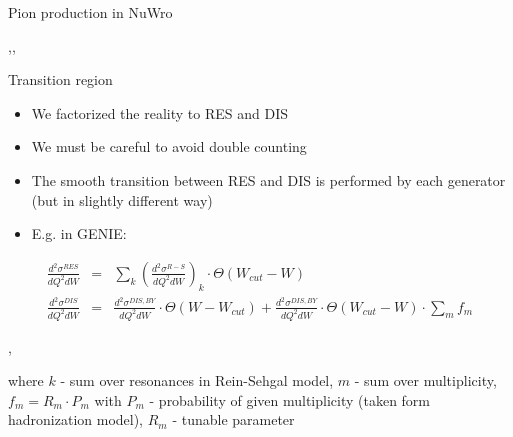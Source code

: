 \begin{slide}[toc=$\pi$ in NuWro]{Pion production in NuWro}
\null\vfill

  \centering

  \sep\sep
  

\vfill\null
\end{slide}

\begin{wideslide}{Transition region}
\null\vfill

  \begin{itemize}
    \item We factorized the reality to RES and DIS 
    \item We must be careful to avoid double counting
    \item The smooth transition between RES and DIS is performed by each generator (but in slightly different way)
    \item E.g. in GENIE:
  \end{itemize}
    
  \begin{eqnarray*}
    \frac{d^2\sigma^{RES}}{dQ^2dW} & = & \sum\limits_k \left(\frac{d^2\sigma^{R-S}}{dQ^2dW}\right)_k\cdot\Theta(W_{cut} - W) \\
    \frac{d^2\sigma^{DIS}}{dQ^2dW} & = & \frac{d^2\sigma^{DIS,BY}}{dQ^2dW}\cdot\Theta(W - W_{cut}) + \frac{d^2\sigma^{DIS,BY}}{dQ^2dW}\cdot\Theta(W_{cut} - W)\cdot\sum\limits_m f_m
  \end{eqnarray*}
  
  \sep
  
  where $k$ - sum over resonances in Rein-Sehgal model, $m$ - sum over multiplicity, $f_m = R_m\cdot P_m$ with $P_m$ - probability of given multiplicity (taken form hadronization model), $R_m$ - tunable parameter

\vfill\null
\end{wideslide}